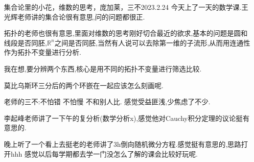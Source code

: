 \begin{diary}{集合论里的小花，维数的思考，庞加莱，三不}{2023.2.24}
    今天上了一天的数学课.王光辉老师讲的集合论很有意思,问的问题都很正.
    
    拓扑的老师也很有意思,里面对维数的思考刚好切合最近的欲求,基本的问题是圆和线段是否同胚,$\mathbb{R}^n$之间是否同胚,当然有人说可以去除第一维的子流形,从而用连通性作为拓扑不变量进行分析.

    我在想,要分辨两个东西,核心是用不同的拓扑不变量进行筛选比较.

    莫比乌斯环三分后的两个环嵌在一起应该怎么刻画呢.

    老师的三不:不怕错 不怕慢 不和别人比. 感觉受益匪浅,少焦虑了不少.

    李起峰老师讲了一下午的复分析(数学分析x),感觉他对Cauchy积分定理的议论挺有意思的.

    晚上听了一个看上去挺老的老师讲了3h倒向随机微分方程.感觉挺有意思的,思路打开hhh 感觉以后每学期都去学一门没怎么了解的课会比较好玩呢.
\end{diary}